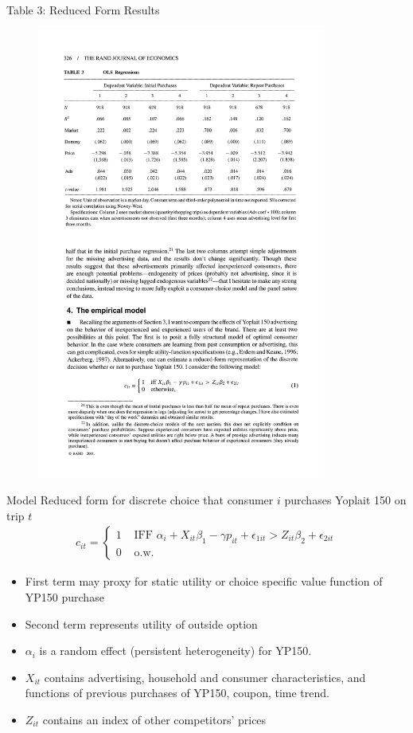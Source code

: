 \documentclass[xcolor=pdftex,dvipsnames,table,mathserif]{beamer}
\begin{document}
\begin{frame}{Table 3: Reduced Form Results}
\begin{figure}[htbp]
\begin{center}
\includegraphics[width=9.5cm]{resources/acker3.pdf}
\label{default}
\end{center}
\end{figure}
\end{frame}



\begin{frame}{Model}
Reduced form for discrete choice that consumer $i$ purchases Yoplait 150 on trip $t$
\begin{eqnarray*}
c_{it} = \begin{cases}
       1 & \mbox{ IFF } \alpha_i + X_{it} \beta_1 - \gamma p_{it} + \epsilon_{1it} > Z_{it} \beta_2 + \epsilon_{2it}\\
       0 & \mbox{ o.w. } 
        \end{cases}
\end{eqnarray*}
\begin{itemize}
\item First term may \alert{proxy} for static utility or choice specific value function of YP150 purchase
\item Second term represents utility of outside option
\item $\alpha_i$ is a random effect (persistent heterogeneity) for YP150.
\item $X_{it}$ contains \alert{advertising}, household and consumer characteristics, and functions of previous purchases of YP150, coupon, time trend.
\item $Z_{it}$ contains an index of other competitors' prices
\end{itemize}
\end{frame}
\end{document}
